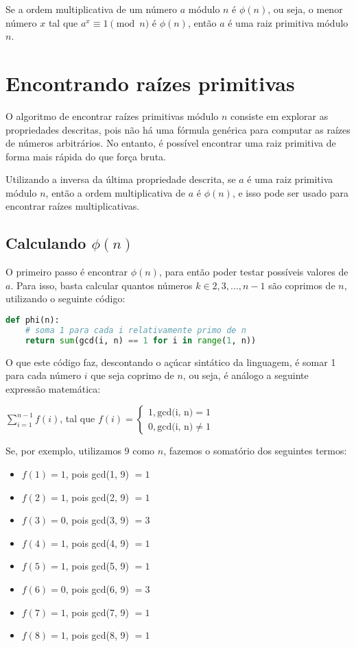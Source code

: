 \documentclass[12pt]{article}
\begin{document}
Se a ordem multiplicativa de um número $a$ módulo $n$ é $\phi(n)$, ou seja, o
menor número $x$ tal que $a^{x} \equiv 1 \pmod{n}$ é $\phi(n)$, então $a$ é uma
raiz primitiva módulo $n$.

\section{Encontrando raízes primitivas}

O algoritmo de encontrar raízes primitivas módulo $n$ consiste em explorar as
propriedades descritas, pois não há uma fórmula genérica para computar as
raízes de números arbitrários. No entanto, é possível encontrar uma raiz
primitiva de forma mais rápida do que força bruta.

Utilizando a inversa da última propriedade descrita, se $a$ é uma raiz
primitiva módulo $n$, então a ordem multiplicativa de $a$ é $\phi(n)$, e isso
pode ser usado para encontrar raízes multiplicativas.

\subsection{Calculando $\phi(n)$}

O primeiro passo é encontrar $\phi(n)$, para então poder testar possíveis
valores de $a$. Para isso, basta calcular quantos números
$k \in {2, 3, ..., n - 1}$ são coprimos de $n$, utilizando o seguinte código:

\begin{lstlisting}[language=Python]
def phi(n):
    # soma 1 para cada i relativamente primo de n
    return sum(gcd(i, n) == 1 for i in range(1, n))
\end{lstlisting}

O que este código faz, descontando o açúcar sintático da linguagem, é somar 1
para cada número $i$ que seja coprimo de $n$, ou seja, é análogo a seguinte
expressão matemática:

\begin{center}
    $\sum_{i=1}^{n-1}f(i)$, tal que $f(i)=\begin{cases}1, \mbox{gcd(i, n)} = 1 \\ 0, \mbox{gcd(i, n)} \not= 1\end{cases}$
\end{center}

Se, por exemplo, utilizamos 9 como $n$, fazemos o somatório dos seguintes
termos:

\begin{itemize}
    \item $f(1) = 1$, pois gcd(1, 9) $= 1$
    \item $f(2) = 1$, pois gcd(2, 9) $= 1$
    \item $f(3) = 0$, pois gcd(3, 9) $= 3$
    \item $f(4) = 1$, pois gcd(4, 9) $= 1$
    \item $f(5) = 1$, pois gcd(5, 9) $= 1$
    \item $f(6) = 0$, pois gcd(6, 9) $= 3$
    \item $f(7) = 1$, pois gcd(7, 9) $= 1$
    \item $f(8) = 1$, pois gcd(8, 9) $= 1$
\end{itemize}
\end{document}
